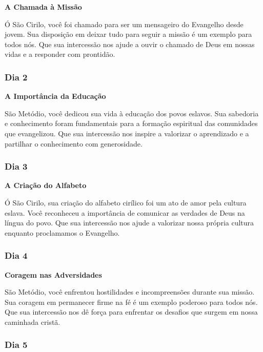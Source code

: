\documentclass[a4paper,14pt]{extarticle} \usepackage[utf8]{inputenc}
\begin{document}
\textbf{A Chamada à Missão}

Ó São Cirilo, você foi chamado para ser um mensageiro do Evangelho desde jovem. Sua disposição em deixar tudo para seguir a missão é um exemplo para todos nós. Que sua intercessão nos ajude a ouvir o chamado de Deus em nossas vidas e a responder com prontidão.

\underline{}

\subsubsection{Dia 2}
\underline{}

\textbf{A Importância da Educação}

São Metódio, você dedicou sua vida à educação dos povos eslavos. Sua sabedoria e conhecimento foram fundamentais para a formação espiritual das comunidades que evangelizou. Que sua intercessão nos inspire a valorizar o aprendizado e a partilhar o conhecimento com generosidade.

\underline{}

\subsubsection{Dia 3}
\underline{}

\textbf{A Criação do Alfabeto}

Ó São Cirilo, sua criação do alfabeto cirílico foi um ato de amor pela cultura eslava. Você reconheceu a importância de comunicar as verdades de Deus na língua do povo. Que sua intercessão nos ajude a valorizar nossa própria cultura enquanto proclamamos o Evangelho.

\underline{}

\subsubsection{Dia 4}
\underline{}

\textbf{Coragem nas Adversidades}

São Metódio, você enfrentou hostilidades e incompreensões durante sua missão. Sua coragem em permanecer firme na fé é um exemplo poderoso para todos nós. Que sua intercessão nos dê força para enfrentar os desafios que surgem em nossa caminhada cristã.

\underline{}

\subsubsection{Dia 5}
\underline{}
\end{document}
